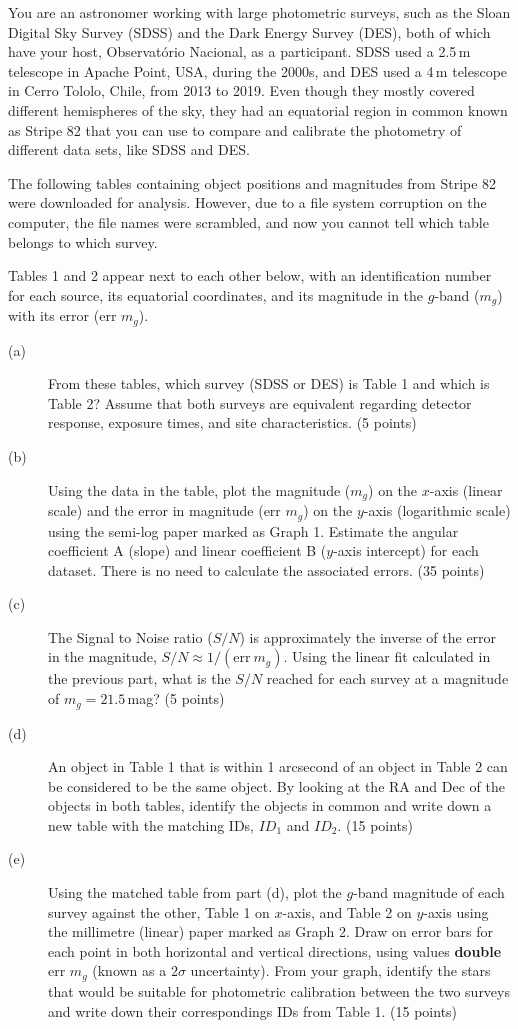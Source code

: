 You are an astronomer working with large photometric surveys, such as the
Sloan Digital Sky Survey (SDSS) and the Dark Energy Survey (DES), both of
which have your host, Observat\'orio Nacional, as a participant. SDSS used a
2.5\,m telescope in Apache Point, USA, during the 2000s, and DES used a 4\,m
telescope in Cerro Tololo, Chile, from 2013 to 2019. Even though they mostly
covered different hemispheres of the sky, they had an equatorial region in
common known as Stripe 82 that you can use to compare and calibrate the
photometry of different data sets, like SDSS and DES.

The following tables containing object positions and magnitudes from Stripe
82 were downloaded for analysis. However, due to a file system corruption on
the computer, the file names were scrambled, and now you cannot tell which
table belongs to which survey.

Tables 1 and 2 appear next to each other below, with an identification
number for each source, its equatorial coordinates, and its magnitude in the
$g$-band ($m_g$) with its error (err $m_g$).

\begin{description}
\item[(a)] From these tables, which survey (SDSS or DES) is Table 1 and
  which is Table 2? Assume that both surveys are equivalent regarding
  detector response, exposure times, and site characteristics.
  \hfill(5 points)
\item[(b)] Using the data in the table, plot the magnitude ($m_g$) on the
  $x$-axis (linear scale) and the error in magnitude (err $m_g$) on the
  $y$-axis (logarithmic scale) using the semi-log paper marked as Graph 1.
  Estimate the angular coefficient A (slope) and linear coefficient B
  ($y$-axis intercept) for each dataset. There is no need to calculate the
  associated errors. \hfill(35 points)
\item[(c)] The Signal to Noise ratio ($S/N$) is approximately the inverse of
  the error in the magnitude, $S/N \approx 1/(\mathrm{err}\ m_g)$. Using the
  linear fit calculated in the previous part, what is the $S/N$ reached for
  each survey at a magnitude of $m_g = 21.5$\,mag? \hfill(5 points)
\item[(d)] An object in Table 1 that is within 1 arcsecond of an object in
  Table 2 can be considered to be the same object. By looking at the RA and
  Dec of the objects in both tables, identify the objects in common and
  write down a new table with the matching IDs, $ID_1$ and $ID_2$.
  \hfill(15 points)
\item[(e)] Using the matched table from part (d), plot the $g$-band
  magnitude of each survey against the other, Table 1 on $x$-axis, and
  Table 2 on $y$-axis using the millimetre (linear) paper marked as Graph 2.
  Draw on error bars for each point in both horizontal and vertical
  directions, using values \textbf{double} err $m_g$ (known as a $2\sigma$
  uncertainty). From your graph, identify the stars that would be suitable
  for photometric calibration between the two surveys and write down their
  correspondings IDs from Table 1. \hfill(15 points)
\end{description}

